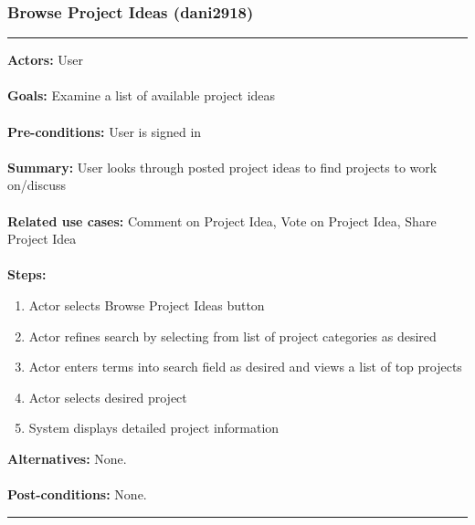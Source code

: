 \documentclass[11pt]{report}
\begin{document}
\subsubsection{Browse Project Ideas (dani2918)}
\vspace{2pt}
\hrule
\vspace{8pt}
 \textbf{Actors:} User \\ \\
\textbf{Goals:} Examine a list of available project ideas  \\ \\
 \textbf{Pre-conditions:} User is signed in  \\ \\
 \textbf{Summary:} User looks through posted project ideas to find projects to work on/discuss \\ \\
\textbf{Related use cases:} Comment on Project Idea, Vote on Project Idea, Share Project Idea \\ \\
\textbf{Steps:} \begin{enumerate}
  \item Actor selects Browse Project Ideas button
  \item Actor refines search by selecting from list of project categories as desired
  \item Actor enters terms into search field as desired and views a list of top projects
  \item Actor selects desired project
  \item System displays detailed project information
 \end{enumerate}
 \textbf{Alternatives:} None. \\ \\
 \textbf{Post-conditions:} None. \\
\vspace{8pt}
\hrule
\newpage
\end{document}
